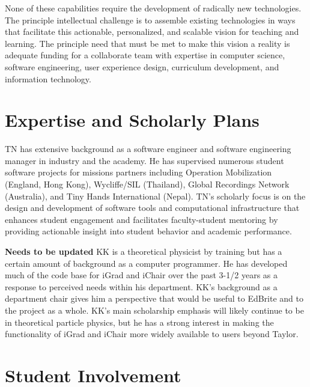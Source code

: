 \documentclass{article}
\begin{document}
None of these capabilities require the development of radically new technologies.
The principle intellectual challenge is to assemble existing technologies
in ways that facilitate this actionable, personalized, and scalable vision for
teaching and learning.
The principle need that must be met to make this vision a reality
is adequate funding for a collaborate team with expertise in
computer science,
software engineering,
user experience design,
curriculum development,
and information technology.

\section{Expertise and Scholarly Plans}
\label{sec:expertise-plans}


TN has extensive background as a software engineer
and software engineering manager
in industry and the academy.
He has supervised numerous student software projects
for missions partners including
Operation Mobilization (England, Hong Kong),
Wycliffe/SIL (Thailand),
Global Recordings Network (Australia),
and
Tiny Hands International (Nepal).
TN's scholarly focus is on the design and development
of software tools and computational infrastructure
that enhances student engagement
and facilitates faculty-student mentoring
by providing actionable insight
into student behavior and academic performance.

\textbf{Needs to be updated}
KK is a theoretical physicist by training but has a certain amount
of background as a computer programmer.  He has developed much of
the code base for iGrad and iChair over the past 3-1/2 years
as a response to perceived needs within his department.  KK's
background as a department chair gives him a perspective that would
be useful to EdBrite and to the project as a whole.  KK's main
scholarship emphasis will likely continue to be in theoretical
particle physics, but he has a strong interest in making the
functionality of iGrad and iChair more widely available to
users beyond Taylor.

\section{Student Involvement}
\label{sec:student-involvement}

\end{document}
